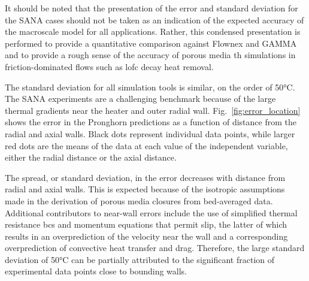 It should be noted that the presentation of the error and standard deviation for the SANA cases should not be taken as an indication of the expected accuracy of the macroscale model for all applications. Rather, this condensed presentation is performed to provide a quantitative comparison against Flownex and GAMMA and to provide a rough sense of the accuracy of porous media \gls{th} simulations in friction-dominated flows such as \gls{lofc} decay heat removal.

The standard deviation for all simulation tools is similar, on the order of 50\si{\celsius}. The SANA experiments are a challenging benchmark because of the large thermal gradients near the heater and outer radial wall. Fig.\ \ref{fig:error_location} shows the error in the Pronghorn predictions as a function of distance from the radial and axial walls. Black dots represent individual data points, while larger red dots are the means of the data at each value of the independent variable, either the radial distance or the axial distance. 

The spread, or standard deviation, in the error decreases with distance from radial and axial walls. This is expected because of the isotropic assumptions made in the derivation of porous media closures from bed-averaged data. Additional contributors to near-wall errors include the use of simplified thermal resistance \glspl{bc} and momentum equations that permit slip, the latter of which results in an overprediction of the velocity near the wall and a corresponding overprediction of convective heat transfer and drag. Therefore, the large standard deviation of 50\si{\celsius} can be partially attributed to the significant fraction of experimental data points close to bounding walls. 

